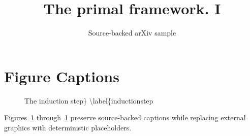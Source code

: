 \documentclass[11pt]{article}
\title{The primal framework. I}
\author{Source-backed arXiv sample}
\date{}
\begin{document}
\maketitle
\section{Figure Captions}

\begin{figure}[htbp]
\centering
\fbox{\rule{0pt}{1.15in}\rule{0.78\linewidth}{0pt}}
\caption{The induction step\} \textbackslash{}label\{inductionstep}
\label{fig:source-1}
\end{figure}


Figures~\ref{fig:source-1} through~\ref{fig:source-1} preserve source-backed captions while replacing external graphics with deterministic placeholders.
\end{document}
